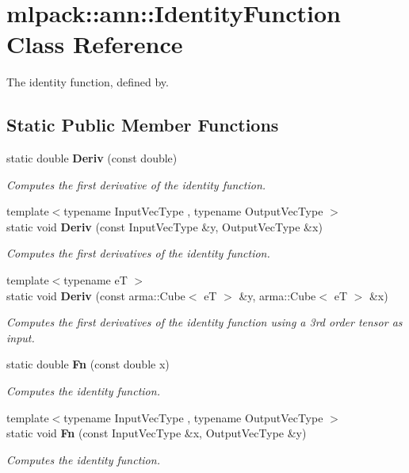 \section{mlpack\+:\+:ann\+:\+:Identity\+Function Class Reference}
\label{classmlpack_1_1ann_1_1IdentityFunction}


The identity function, defined by.  


\subsection*{Static Public Member Functions}
\begin{DoxyCompactItemize}
\item 
static double {\bf Deriv} (const double)
\begin{DoxyCompactList}\small\item\em Computes the first derivative of the identity function. \end{DoxyCompactList}\item 
{\footnotesize template$<$typename Input\+Vec\+Type , typename Output\+Vec\+Type $>$ }\\static void {\bf Deriv} (const Input\+Vec\+Type \&y, Output\+Vec\+Type \&x)
\begin{DoxyCompactList}\small\item\em Computes the first derivatives of the identity function. \end{DoxyCompactList}\item 
{\footnotesize template$<$typename eT $>$ }\\static void {\bf Deriv} (const arma\+::\+Cube$<$ eT $>$ \&y, arma\+::\+Cube$<$ eT $>$ \&x)
\begin{DoxyCompactList}\small\item\em Computes the first derivatives of the identity function using a 3rd order tensor as input. \end{DoxyCompactList}\item 
static double {\bf Fn} (const double x)
\begin{DoxyCompactList}\small\item\em Computes the identity function. \end{DoxyCompactList}\item 
{\footnotesize template$<$typename Input\+Vec\+Type , typename Output\+Vec\+Type $>$ }\\static void {\bf Fn} (const Input\+Vec\+Type \&x, Output\+Vec\+Type \&y)
\begin{DoxyCompactList}\small\item\em Computes the identity function. \end{DoxyCompactList}\end{DoxyCompactItemize}


